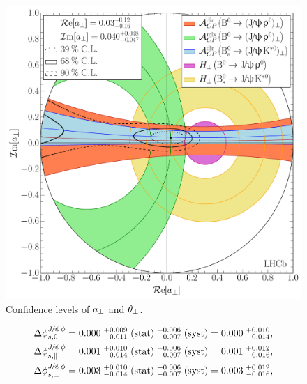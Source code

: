 \begin{figure}[t]
  \centering
  \includegraphics[trim=0.0cm 0.0cm 0.0cm 0.0cm, clip=true,scale=0.39]{Figures/Chapter5/Penguin_Contribution_Re_vs_Im_allB2VV_Perp_withH.pdf}
  \caption{Confidence levels of $a_{\perp}$ and $\theta_{\perp}$.}
  \label{pengPlot_perp}
\end{figure}

\begin{subequations}
\label{delta_phis_result}
\begin{align}
\Delta\phi^{{J\mskip -3mu/\mskip -2mu\psi\mskip 2mu}\phi}_{s,{0}}         & = 0.000 \; ^{+0.009}_{-0.011} \; {\rm (stat)} \; ^{+0.006}_{-0.007} \; ({\rm syst}) = 0.000 \; ^{+0.010}_{-0.014},\\
\Delta\phi^{{J\mskip -3mu/\mskip -2mu\psi\mskip 2mu}\phi}_{s,{\parallel}} & = 0.001 \; ^{+0.010}_{-0.014} \; {\rm (stat)} \; ^{+0.006}_{-0.007} \; ({\rm syst)} = 0.001 \; ^{+0.012}_{-0.016},\\
\Delta\phi^{{J\mskip -3mu/\mskip -2mu\psi\mskip 2mu}\phi}_{s,{\perp}}     & = 0.003 \; ^{+0.010}_{-0.014} \; {\rm (stat)} \; ^{+0.006}_{-0.007} \; ({\rm syst)} = 0.003 \; ^{+0.012}_{-0.016},
\end{align}
\end{subequations}

